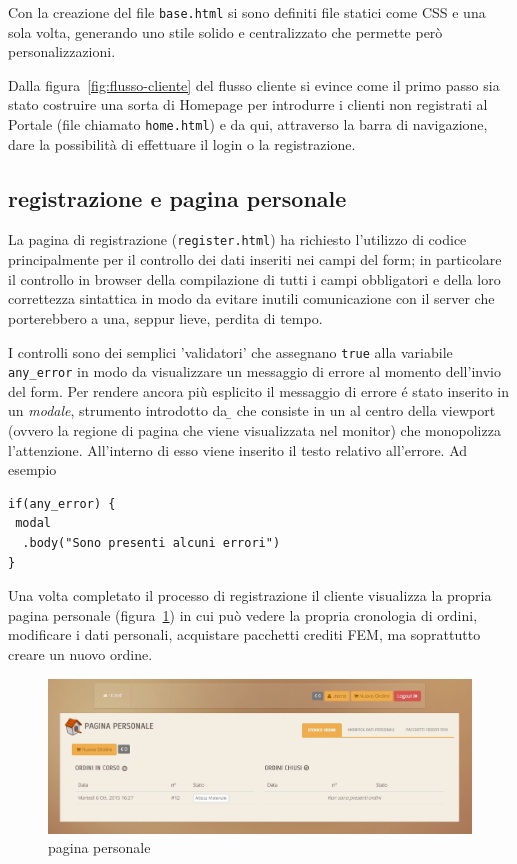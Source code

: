 Con la creazione del file \texttt{base.html} si sono definiti file statici come CSS e {\js} una sola volta, generando uno stile solido e centralizzato che permette però personalizzazioni.

Dalla figura~\ref{fig:flusso-cliente} del flusso cliente si evince come il primo passo sia stato costruire una sorta di Homepage per introdurre i clienti non registrati al Portale (file chiamato \texttt{home.html}) e da qui, attraverso la barra di navigazione, dare la possibilità di effettuare il login o la registrazione.

\subsection*{registrazione e pagina personale}
\label{subs:preg-ppers}
La pagina di registrazione (\texttt{register.html}) ha richiesto l'utilizzo di codice {\js} principalmente per il controllo dei dati inseriti nei campi del form; in particolare il controllo in browser della compilazione di tutti i campi obbligatori e della loro correttezza sintattica in modo da evitare inutili comunicazione con il server che porterebbero a una, seppur lieve, perdita di tempo.

I controlli sono dei semplici 'validatori' che assegnano \texttt{true} alla variabile \texttt{any\_error} in modo da visualizzare un messaggio di errore al momento dell'invio del form. Per rendere ancora più esplicito il messaggio di errore é stato inserito in un \emph{modale}, strumento introdotto da {\b} che consiste in un  al centro della viewport (ovvero la regione di pagina che viene visualizzata nel monitor) che monopolizza l'attenzione. All'interno di esso viene inserito il testo relativo all'errore. Ad esempio
\begin{verbatim}
if(any_error) {
 modal
  .body("Sono presenti alcuni errori")
}
\end{verbatim}

Una volta completato il processo di registrazione il cliente visualizza la propria pagina personale (figura~\ref{fig:ppersonale}) in cui può vedere la propria cronologia di ordini, modificare i dati personali, acquistare pacchetti crediti FEM, ma soprattutto creare un nuovo ordine.

\begin{figure}
 \includegraphics[width=1\textwidth]{images/ppersonale} 
 \caption{pagina personale}
 \label{fig:ppersonale}
\end{figure}

